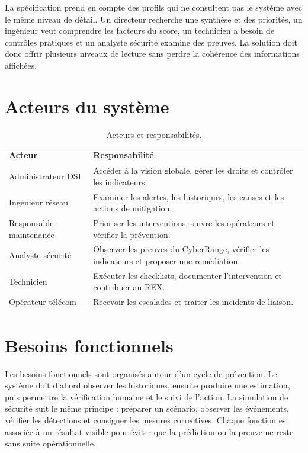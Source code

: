 \documentclass[12pt,a4paper,oneside]{report}
\begin{document}
La spécification prend en compte des profils qui ne consultent pas le système avec le même niveau de détail. Un directeur recherche une synthèse et des priorités, un ingénieur veut comprendre les facteurs du score, un technicien a besoin de contrôles pratiques et un analyste sécurité examine des preuves. La solution doit donc offrir plusieurs niveaux de lecture sans perdre la cohérence des informations affichées.

\section{Acteurs du système}

\begin{table}[H]
\centering
\small
\caption{Acteurs et responsabilités.}
\begin{tabularx}{\textwidth}{B{4.0cm} X}
\toprule
Acteur & Responsabilité\\
\midrule
Administrateur DSI & Accéder à la vision globale, gérer les droits et contrôler les indicateurs.\\
Ingénieur réseau & Examiner les alertes, les historiques, les causes et les actions de mitigation.\\
Responsable maintenance & Prioriser les interventions, suivre les opérateurs et vérifier la prévention.\\
Analyste sécurité & Observer les preuves du CyberRange, vérifier les indicateurs et proposer une remédiation.\\
Technicien & Exécuter les checklists, documenter l’intervention et contribuer au REX.\\
Opérateur télécom & Recevoir les escalades et traiter les incidents de liaison.\\
\bottomrule
\end{tabularx}
\end{table}

\section{Besoins fonctionnels}

Les besoins fonctionnels sont organisés autour d’un cycle de prévention. Le système doit d’abord observer les historiques, ensuite produire une estimation, puis permettre la vérification humaine et le suivi de l’action. La simulation de sécurité suit le même principe : préparer un scénario, observer les événements, vérifier les détections et consigner les mesures correctives. Chaque fonction est associée à un résultat visible pour éviter que la prédiction ou la preuve ne reste sans suite opérationnelle.
\end{document}
